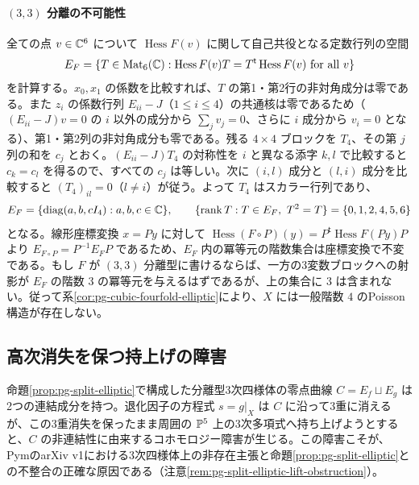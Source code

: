 \begin{example}
\paragraph{$(3,3)$ 分離の不可能性}
全ての点 $v\in\mathbb C^6$ について $\operatorname{Hess}F(v)$ に関して自己共役となる定数行列の空間
\begin{equation}\label{eq:pg-hessian-counterexample-symmetrizer}
E_F=\{T\in\operatorname{Mat}_6(\mathbb C):
        \operatorname{Hess}F(v)T=T^{\mathsf t}\operatorname{Hess}F(v)
        \text{ for all }v\}
\end{equation}
を計算する。$x_0,x_1$ の係数を比較すれば、$T$ の第1・第2行の非対角成分は零である。また $z_i$ の係数行列 $E_{ii}-J$（$1\le i\le4$）の共通核は零であるため（$(E_{ii}-J)v=0$ の $i$ 以外の成分から $\sum_j v_j=0$、さらに $i$ 成分から $v_i=0$ となる）、第1・第2列の非対角成分も零である。残る $4\times4$ ブロックを $T_4$、その第 $j$ 列の和を $c_j$ とおく。$(E_{ii}-J)T_4$ の対称性を $i$ と異なる添字 $k,l$ で比較すると $c_k=c_l$ を得るので、すべての $c_j$ は等しい。次に $(i,l)$ 成分と $(l,i)$ 成分を比較すると $(T_4)_{il}=0$（$l\ne i$）が従う。よって $T_4$ はスカラー行列であり、
\begin{equation}\label{eq:pg-hessian-counterexample-algebra}
E_F=\{\operatorname{diag}(a,b,cI_4):a,b,c\in\mathbb C\},
\qquad
\{\operatorname{rank}T:T\in E_F,\ T^2=T\}
=\{0,1,2,4,5,6\}
\end{equation}
となる。線形座標変換 $x=Py$ に対して $\operatorname{Hess}(F\circ P)(y)=P^{\mathsf t}\operatorname{Hess}F(Py)P$ より $E_{F\circ P}=P^{-1}E_FP$ であるため、$E_F$ 内の冪等元の階数集合は座標変換で不変である。もし $F$ が $(3,3)$ 分離型に書けるならば、一方の3変数ブロックへの射影が $E_F$ の階数 $3$ の冪等元を与えるはずであるが、上の集合に $3$ は含まれない。従って系\ref{cor:pg-cubic-fourfold-elliptic}により、$X$ には一般階数 $4$ のPoisson構造が存在しない。
\end{example}

\subsection{高次消失を保つ持上げの障害}\label{subsec:pg-lifting-obstruction}
命題\ref{prop:pg-split-elliptic}で構成した分離型3次四様体の零点曲線 $C=E_f\sqcup E_g$ は2つの連結成分を持つ。退化因子の方程式 $s=g|_X$ は $C$ に沿って3重に消えるが、この3重消失を保ったまま周囲の $\mathbb P^5$ 上の3次多項式へ持ち上げようとすると、$C$ の非連結性に由来するコホモロジー障害が生じる。この障害こそが、PymのarXiv v1における3次四様体上の非存在主張と命題\ref{prop:pg-split-elliptic}との不整合の正確な原因である（注意\ref{rem:pg-split-elliptic-lift-obstruction}）。

